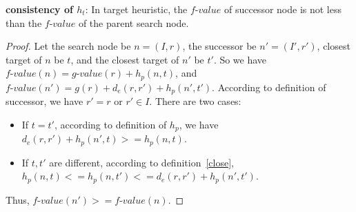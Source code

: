 \begin{theorem}{\textbf{consistency of $h_t$}:}\label{nodesct}
In target heuristic, the $\textit{f-value}$ of successor node is not less than the $\textit{f-value}$ of the parent search node.
\end{theorem}

\begin{proof}
  Let the search node be $n=(I, r)$, the successor be $n'=(I', r')$, closest target of $n$
  be $t$, and the closest target of $n'$ be $t'$. 
  So we have $\textit{f-value}(n) = \textit{g-value}(r) + h_p(n, t)$, and 
  $\textit{f-value}(n') = g(r) + d_e(r, r') + h_p(n', t')$.
  According to definition of successor\cite{cuicompromise}, we have $r'=r$ or $r' \in I$.
  There are two cases:
  \begin{itemize}
    \item If $t=t'$, according to definition of $h_p$\cite{cuicompromise},
      we have $d_e(r, r') + h_p(n', t) >= h_p(n, t)$. 
    \item If $t,t'$ are different, according to definition~\ref{close},
      $h_p(n, t) <= h_p(n, t') <= d_e(r, r') + h_p(n', t')$.
  \end{itemize}
  Thus, $\textit{f-value}(n') >= \textit{f-value}(n)$.
\end{proof}

